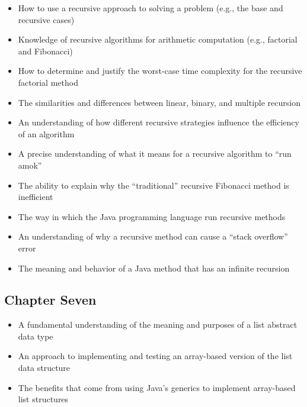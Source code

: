 \documentclass[11pt]{article}
\begin{document}
\begin{itemize}

  \setlength{\itemsep}{0.05in}

  \item How to use a recursive approach to solving a problem (e.g., the base
    and recursive cases)
  \item Knowledge of recursive algorithms for arithmetic computation (e.g., factorial
    and Fibonacci)
  \item How to determine and justify the worst-case time complexity for
    the recursive factorial method
  \item The similarities and differences between linear, binary, and multiple
    recursion
  \item An understanding of how different recursive strategies influence the
    efficiency of an algorithm
  \item A precise understanding of what it means for a recursive algorithm to
    ``run amok''
  \item The ability to explain why the ``traditional'' recursive Fibonacci
    method is inefficient
  \item The way in which the Java programming language run recursive methods
  \item An understanding of why a recursive method can cause a ``stack
    overflow'' error
  \item The meaning and behavior of a Java method that has an infinite recursion

\end{itemize}

\vspace*{-.2in}
\subsection*{Chapter Seven}

\begin{itemize}

  \setlength{\itemsep}{0.05in}

  \item A fundamental understanding of the meaning and purposes of a list
    abstract data type

  \item An approach to implementing and testing an array-based version of the
    list data structure

  \item The benefits that come from using Java's generics to implement
    array-based list structures

\end{itemize}
\end{document}
